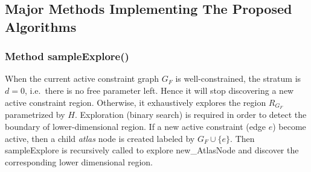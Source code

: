 \subsection{Major Methods Implementing The Proposed Algorithms }
\label{sec:pseudocode}

\subsubsection{ Method sampleExplore()} %
\label{sec:sampleExplore}

When the current active constraint graph $G_F$ is well-constrained, the stratum is $d=0$, i.e.\ there is no free parameter left.
Hence it will stop discovering a new active constraint region.
Otherwise, it exhaustively explores the region $R_{G_F}$ parametrized by $H$. %
Exploration (binary search) is required in order to detect the boundary of lower-dimensional region.
If a new active constraint (edge $e$) become active, then a child \textit{atlas} node is created labeled by $G_F \cup \{e\}$.
Then sampleExplore is recursively called to explore new\_AtlasNode and discover the corresponding lower dimensional region.\\


